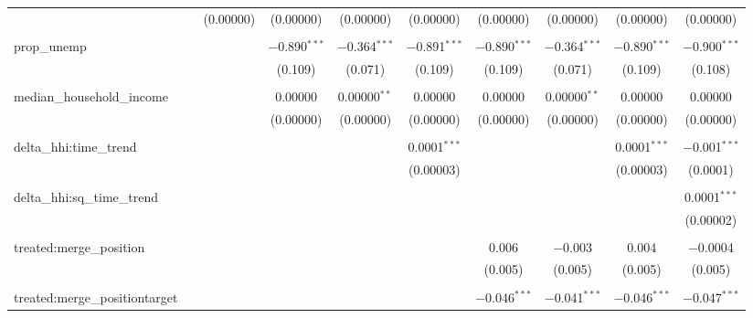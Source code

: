 \begin{table}[H]
{\begin{tabular}{@{\extracolsep{5pt}}lccccccccc}
   &  & (0.00000) & (0.00000) & (0.00000) & (0.00000) & (0.00000) & (0.00000) & (0.00000) & (0.00000) \\  

   & & & & & & & & & \\  

  prop\_unemp &  &  & $-$0.890$^{***}$ & $-$0.364$^{***}$ & $-$0.891$^{***}$ & $-$0.890$^{***}$ & $-$0.364$^{***}$ & $-$0.890$^{***}$ & $-$0.900$^{***}$ \\  

   &  &  & (0.109) & (0.071) & (0.109) & (0.109) & (0.071) & (0.109) & (0.108) \\  

   & & & & & & & & & \\  

  median\_household\_income &  &  & 0.00000 & 0.00000$^{**}$ & 0.00000 & 0.00000 & 0.00000$^{**}$ & 0.00000 & 0.00000 \\  

   &  &  & (0.00000) & (0.00000) & (0.00000) & (0.00000) & (0.00000) & (0.00000) & (0.00000) \\  

   & & & & & & & & & \\  

  delta\_hhi:time\_trend &  &  &  &  & 0.0001$^{***}$ &  &  & 0.0001$^{***}$ & $-$0.001$^{***}$ \\  

   &  &  &  &  & (0.00003) &  &  & (0.00003) & (0.0001) \\  

   & & & & & & & & & \\  

  delta\_hhi:sq\_time\_trend &  &  &  &  &  &  &  &  & 0.0001$^{***}$ \\  

   &  &  &  &  &  &  &  &  & (0.00002) \\  

   & & & & & & & & & \\  

  treated:merge\_position &  &  &  &  &  & 0.006 & $-$0.003 & 0.004 & $-$0.0004 \\  

   &  &  &  &  &  & (0.005) & (0.005) & (0.005) & (0.005) \\  

   & & & & & & & & & \\  

  treated:merge\_positiontarget &  &  &  &  &  & $-$0.046$^{***}$ & $-$0.041$^{***}$ & $-$0.046$^{***}$ & $-$0.047$^{***}$ \\  


\end{tabular}}
\end{table}
